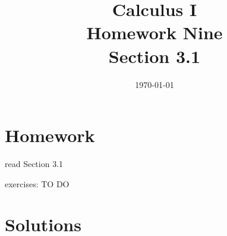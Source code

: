 \documentclass[letterpaper]{exam}
\title{Calculus I \\ Homework Nine \\ Section 3.1}
\author{}
\date{\today}
\begin{document}
  \maketitle

  \section{Homework}
    \begin{itemize*}
      \item read Section 3.1
      \item exercises: TO DO
    \end{itemize*}

  \ifprintanswers

  \section{Solutions}
\end{document}
